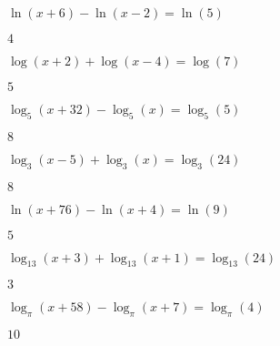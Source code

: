 \begin{exercises}
\begin{problem}
\begin{multicols}{2}
\begin{subproblem}
	\end{subproblem}
	\begin{subproblem}
		$\ln(x+6)-\ln(x-2)=\ln(5)$ 
		\begin{shortsolution}
			$4$
		\end{shortsolution}
	\end{subproblem}
	\begin{subproblem}
		$\log(x+2)+\log(x-4)=\log(7)$ 
		\begin{shortsolution}
			$5$
		\end{shortsolution}
	\end{subproblem}
	\begin{subproblem}
		$\log_5(x+32)-\log_5(x)=\log_5(5)$ 
		\begin{shortsolution}
			$8$
		\end{shortsolution}
	\end{subproblem}
	\begin{subproblem}
		$\log_3(x-5)+\log_3(x)=\log_3(24)$ 
		\begin{shortsolution}
			$8$
		\end{shortsolution}
	\end{subproblem}
	\begin{subproblem}
		$\ln(x+76)-\ln(x+4)=\ln(9)$ 
		\begin{shortsolution}
			$5$
		\end{shortsolution}
	\end{subproblem}
	\begin{subproblem}
		$\log_{13}(x+3)+\log_{13}(x+1)=\log_{13}(24)$ 
		\begin{shortsolution}
			$3$
		\end{shortsolution}
	\end{subproblem}
	\begin{subproblem}
		$\log_{\pi}(x+58)-\log_{\pi}(x+7)=\log_{\pi}(4)$ 
		\begin{shortsolution}
			$10$
		\end{shortsolution}
	\end{subproblem}
\end{multicols}
\end{problem}


\end{exercises}
